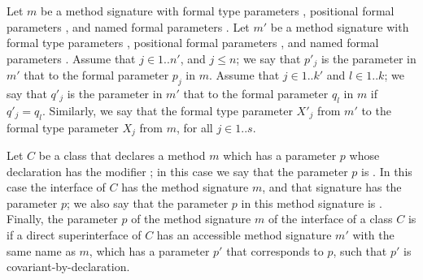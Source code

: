 \documentclass[makeidx]{article}
\begin{document}
\LMHash{}%
Let $m$ be a method signature with formal type parameters
,
positional formal parameters ,
and named formal parameters .
Let $m'$ be a method signature with formal type parameters
,
positional formal parameters ,
and named formal parameters .
%
Assume that $j \in 1 .. n'$, and $j \leq n$;
we say that $p'_j$ is the parameter in $m'$ that
to the formal parameter $p_j$ in $m$.
Assume that $j \in 1 .. k'$ and $l \in 1 .. k$;
we say that $q'_j$ is the parameter in $m'$ that
 to the formal parameter
$q_l$ in $m$ if $q'_j = q_l$.
%
Similarly, we say that the formal type parameter
$X'_j$ from $m'$
 to the formal type parameter
$X_j$ from $m$, for all $j \in 1 .. s$.



\LMHash{}%
Let $C$ be a class that declares a method $m$ which has
a parameter $p$ whose declaration has the modifier \COVARIANT{};
in this case we say that the parameter $p$ is
.
%
In this case the interface of $C$ has the method signature $m$,
and that signature has the parameter $p$;
we also say that the parameter $p$ in this method signature is
.
%
Finally, the parameter $p$ of the method signature $m$
of the interface of a class $C$ is
if a direct superinterface of $C$
has an accessible method signature $m'$ with the same name as $m$,
which has a parameter $p'$ that corresponds to $p$,
such that $p'$ is covariant-by-declaration.
\end{document}
